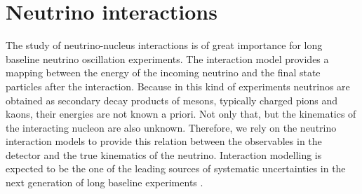 \section{Neutrino interactions}

The study of neutrino-nucleus interactions is of great importance for long baseline neutrino oscillation experiments. The interaction model provides a mapping between the energy of the incoming neutrino and the final state particles after the interaction. Because in this kind of experiments neutrinos are obtained as secondary decay products of mesons, typically charged pions and kaons, their energies are not known a priori. Not only that, but the kinematics of the interacting nucleon are also unknown. Therefore, we rely on the neutrino interaction models to provide this relation between the observables in the detector and the true kinematics of the neutrino. Interaction modelling is expected to be the one of the leading sources of systematic uncertainties in the next generation of long baseline experiments \cite{Coloma2013,Coloma2013a,Mosel2016}.

